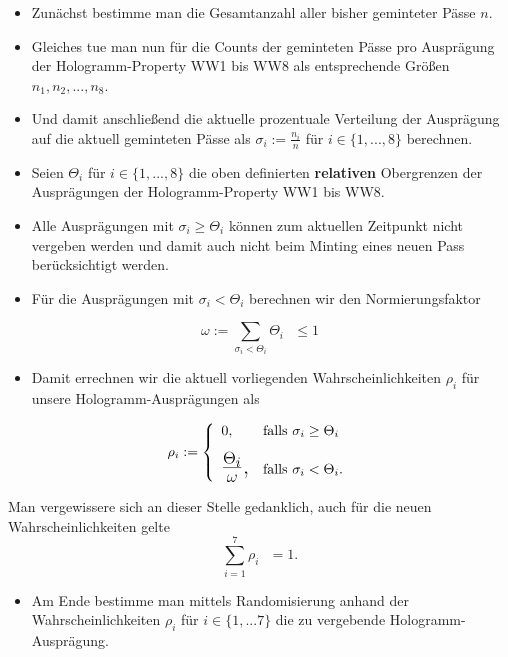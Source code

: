 \begin{Algo}

\begin{itemize}
    \item Zunächst bestimme man die Gesamtanzahl aller bisher geminteter Pässe $n$.
    \item Gleiches tue man nun für die Counts der geminteten Pässe pro Ausprägung der Hologramm-Property WW1 bis WW8 als entsprechende Größen $n_1, n_2,...,n_8$.
    \item Und damit anschließend die aktuelle prozentuale Verteilung der Ausprägung auf die aktuell geminteten Pässe als $\sigma_i:= \frac{n_i}{n}$ für $i \in \lbrace 1,...,8 \rbrace$ berechnen.
    \item Seien $\Theta_i$ für $i \in \lbrace 1,...,8 \rbrace$ die oben definierten \textbf{relativen} Obergrenzen der \newline Ausprägungen der Hologramm-Property WW1 bis WW8.
    \item Alle Ausprägungen mit $\sigma_i \geq \Theta_i$ können zum aktuellen Zeitpunkt nicht vergeben werden und damit auch nicht beim Minting eines neuen Pass berücksichtigt werden.
    \item Für die Ausprägungen mit $\sigma_i < \Theta_i$ berechnen wir den Normierungsfaktor
\end{itemize} 

\begin{equation*}
\omega := \sum_{\sigma_i < \Theta_i} \Theta_i \textrm{ } \leq 1
\end{equation*} 

\begin{itemize}
    \item Damit errechnen wir die aktuell vorliegenden Wahrscheinlichkeiten $\rho_i$ für unsere Hologramm-Ausprägungen als
\end{itemize} 

\[
\rho_i:=\left\{%
\begin{array}{ll}
    0, & \hbox{falls $\sigma_i \geq \Theta_i$} \\[0,3cm]
    \hbox{\LARGE $\frac{\Theta_i}{\omega}$,} & \hbox{falls $\sigma_i < \Theta_i$}. \\
\end{array}%
\right.
\] 

Man vergewissere sich an dieser Stelle gedanklich, auch für die neuen \newline Wahrscheinlichkeiten gelte \[\sum_{i = 1}^7 \rho_i \textrm{ } = 1.\]

\begin{itemize}
    \item Am Ende bestimme man mittels Randomisierung anhand der Wahrscheinlichkeiten $\rho_i$ für $i \in \lbrace 1,...7 \rbrace$ die zu vergebende Hologramm-Ausprägung. 
\end{itemize}

\end{Algo}

